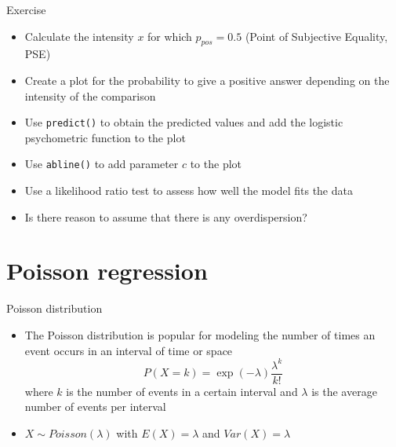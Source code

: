 \documentclass[aspectratio=169]{beamer}
\begin{document}
\begin{frame}[fragile]{}
  \begin{block}{Exercise}
    \begin{itemize}
      \item Calculate the intensity $x$ for which $p_{pos} = 0.5$ (Point of
        Subjective Equality, PSE)
      \item Create a plot for the probability to give a positive answer
        depending on the intensity of the comparison
      \item Use \texttt{predict()} to obtain the predicted values and add
        the logistic psychometric function to the plot
      \item Use \texttt{abline()} to add parameter $c$ to the plot
      \item Use a likelihood ratio test to assess how well the model fits the
        data
      \item Is there reason to assume that there is any overdispersion?
    \end{itemize}
  \end{block}
\end{frame}

\section{Poisson regression}

\begin{frame}{Poisson distribution}
\begin{itemize}
  \item The Poisson distribution is popular for modeling the number of
    times an event occurs in an interval of time or space
\[
  P(X = k) = \exp(-\lambda)\frac{\lambda^k}{k!}
\]
where $k$ is the number of events in a certain interval and $\lambda$ is
the average number of events per interval
\item $X \sim Poisson(\lambda)$ with $E(X) = \lambda$ and $Var(X) = \lambda$ 
\end{itemize}
\end{frame}
\end{document}
